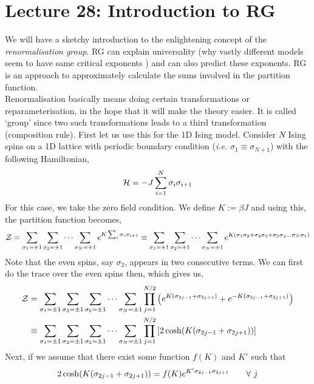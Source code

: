 \section*{Lecture 28: Introduction to RG}
We will have a sketchy introduction to the enlightening concept of the \textit{renormalisation group}. RG can explain universality (why vastly different models seem to have same critical exponents ) and can also predict these exponents. RG is an approach to approximately calculate the sums involved in the partition function. \\[0.2cm]
Renormalisation basically means doing certain transformations or reparameterisation, in the hope that it will make the theory easier. It is called `group' since two such transformations leads to a third transformation (composition rule). 
First let us use this for the 1D Ising model. Consider $N$ Ising spins on a 1D lattice with periodic boundary condition (\textit{i.e.} $\sigma_1 \equiv \sigma_{N+1}$) with the following Hamiltonian,
$$\mathcal H = -J \sum\limits_{i=1}^N \sigma_i \sigma_{i+1}$$
For this case, we take the zero field condition. We define $K := \beta J$ and using this, the partition function becomes, 
$$\mathcal Z = \sum\limits_{\sigma_1 = \pm 1}\sum\limits_{\sigma_2 = \pm 1}\cdots \sum\limits_{\sigma_N = \pm 1} e^{K\sum_i \sigma_i \sigma_{i+1}} \equiv \sum\limits_{\sigma_1 = \pm 1}\sum\limits_{\sigma_2 = \pm 1}\cdots \sum\limits_{\sigma_N = \pm 1} e^{K\qty(\sigma_1 \sigma_2 + \sigma_2\sigma_3 + \sigma_3\sigma_4 \ldots \sigma_N\sigma_1)}$$
Note that the even spins, say $\sigma_2$, appears in two consecutive terms. We can first do the trace over the even spins then, which gives us, 
\begin{align}
    \begin{split}
        \mathcal Z &= \sum\limits_{\sigma_1 = \pm 1}\sum\limits_{\sigma_3 = \pm 1}\sum\limits_{\sigma_5 = \pm 1}\cdots \sum\limits_{\sigma_N = \pm 1} \prod\limits_{j=1}^{N/2} \qty(e^{K \qty(\sigma_{2j-1}+\sigma_{2j+1})}+e^{-K \qty(\sigma_{2j-1}+\sigma_{2j+1})})\\
&\equiv \sum\limits_{\sigma_1 = \pm 1}\sum\limits_{\sigma_3 = \pm 1}\sum\limits_{\sigma_5 = \pm 1}\cdots \sum\limits_{\sigma_N = \pm 1} \prod\limits_{j=1}^{N/2} \qty[2\cosh(K \qty(\sigma_{2j-1}+\sigma_{2j+1}))]
    \end{split}
\end{align}
Next, if we assume that there exist some function $f(K)$ and $K'$ such that \begin{equation}\label{coshspin}
    2\cosh(K \qty(\sigma_{2j-1}+\sigma_{2j+1})) = f(K)e^{K'\sigma_{2j-1}\sigma_{2j+1}}\qquad \forall\ j 
\end{equation}
